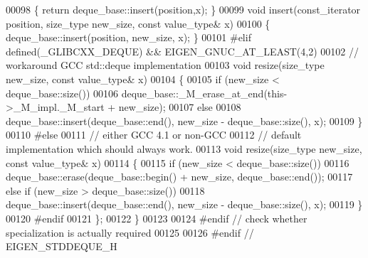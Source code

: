 \begin{DoxyCode}
00098   \{ \textcolor{keywordflow}{return} deque\_base::insert(position,x); \}
00099   \textcolor{keywordtype}{void} insert(const\_iterator position, size\_type new\_size, \textcolor{keyword}{const} value\_type& x)
00100   \{ deque\_base::insert(position, new\_size, x); \}
00101 \textcolor{preprocessor}{#elif defined(\_GLIBCXX\_DEQUE) && EIGEN\_GNUC\_AT\_LEAST(4,2)}
00102   \textcolor{comment}{// workaround GCC std::deque implementation}
00103   \textcolor{keywordtype}{void} resize(size\_type new\_size, \textcolor{keyword}{const} value\_type& x)
00104   \{
00105     \textcolor{keywordflow}{if} (new\_size < deque\_base::size())
00106       deque\_base::\_M\_erase\_at\_end(this->\_M\_impl.\_M\_start + new\_size);
00107     \textcolor{keywordflow}{else}
00108       deque\_base::insert(deque\_base::end(), new\_size - deque\_base::size(), x);
00109   \}
00110 \textcolor{preprocessor}{#else}
00111   \textcolor{comment}{// either GCC 4.1 or non-GCC}
00112   \textcolor{comment}{// default implementation which should always work.}
00113   \textcolor{keywordtype}{void} resize(size\_type new\_size, \textcolor{keyword}{const} value\_type& x)
00114   \{
00115     \textcolor{keywordflow}{if} (new\_size < deque\_base::size())
00116       deque\_base::erase(deque\_base::begin() + new\_size, deque\_base::end());
00117     \textcolor{keywordflow}{else} \textcolor{keywordflow}{if} (new\_size > deque\_base::size())
00118       deque\_base::insert(deque\_base::end(), new\_size - deque\_base::size(), x);
00119   \}
00120 \textcolor{preprocessor}{#endif}
00121   \};
00122 \}
00123 
00124 \textcolor{preprocessor}{#endif // check whether specialization is actually required}
00125 
00126 \textcolor{preprocessor}{#endif // EIGEN\_STDDEQUE\_H}
\end{DoxyCode}
